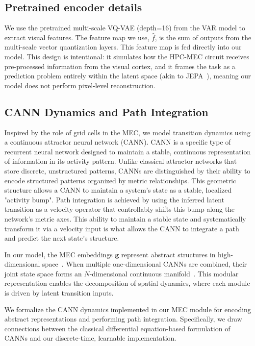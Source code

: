 \subsection{Pretrained encoder details}
\label{appendix:VQVAE}
We use the pretrained multi-scale VQ-VAE (depth=16) from the VAR model to extract visual features. The feature map we use, $\hat{f}$, is the sum of outputs from the multi-scale vector quantization layers. This feature map is fed directly into our model. This design is intentional: it simulates how the HPC-MEC circuit receives pre-processed information from the visual cortex, and it frames the task as a prediction problem entirely within the latent space (akin to JEPA~\citep{lecunPathAutonomousMachine}), meaning our model does not perform pixel-level reconstruction.

\subsection{CANN Dynamics and Path Integration}
\label{appendix:path_integration}

Inspired by the role of grid cells in the MEC, we model transition dynamics using a continuous attractor neural network (CANN). 
 CANN is a specific type of recurrent neural network designed to maintain a stable, continuous representation of information in its activity pattern. Unlike classical attractor networks that store discrete, unstructured patterns, CANNs are distinguished by their ability to encode structured patterns organized by metric relationships. This geometric structure allows a CANN to maintain a system's state as a stable, localized "activity bump". Path integration is achieved by using the inferred latent transition as a velocity operator that controllably shifts this bump along the network's metric axes. This ability to maintain a stable state and systematically transform it via a velocity input is what allows the CANN to integrate a path and predict the next state's structure.
 
In our model, the MEC embeddings $\boldsymbol{g}$ represent abstract structures in high-dimensional space~\citep{klukas2020efficient}. When multiple one-dimensional CANNs are combined, their joint state space forms an $N$-dimensional continuous manifold~\citep{burgess2014controlling}. This modular representation enables the decomposition of spatial dynamics, where each module is driven by latent transition inputs. 

We formalize the CANN dynamics implemented in our MEC module for encoding abstract representations and performing path integration. Specifically, we draw connections between the classical differential equation-based formulation of CANNs and our discrete-time, learnable implementation.

